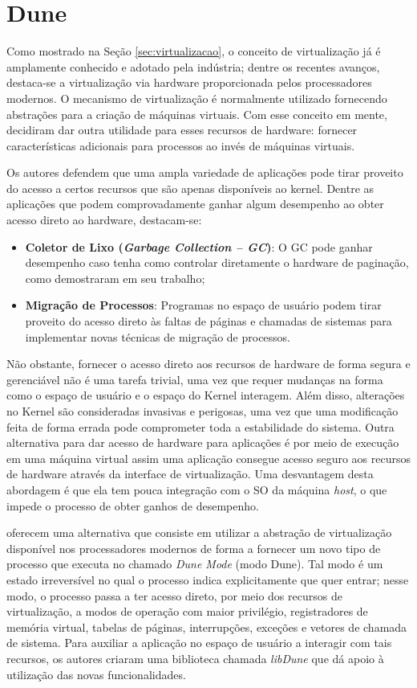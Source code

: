 \section{Dune}
\label{sec:dune}

Como mostrado na Seção \ref{sec:virtualizacao}, o conceito de virtualização já
é amplamente conhecido e adotado pela indústria; dentre os recentes avanços,
destaca-se a virtualização via hardware proporcionada pelos processadores
modernos. O mecanismo de virtualização é normalmente utilizado fornecendo
abstrações para a criação de máquinas virtuais. Com esse conceito em mente,
\citet{belay} decidiram dar outra utilidade para esses recursos de hardware:
fornecer características adicionais para processos ao invés de máquinas
virtuais.

Os autores defendem que uma ampla variedade de aplicações pode tirar proveito
do acesso a certos recursos que são apenas disponíveis ao kernel. Dentre as
aplicações que podem comprovadamente ganhar algum desempenho ao obter acesso
direto ao hardware, destacam-se:

\begin{itemize}
  \item \textbf{Coletor de Lixo (\emph{Garbage Collection -- GC})}: O GC pode ganhar desempenho caso
        tenha como controlar diretamente o hardware de paginação, como
        \citet{pauseless} demostraram em seu trabalho;
  \item \textbf{Migração de Processos}: Programas no espaço de usuário podem tirar
        proveito do acesso direto às faltas de páginas e chamadas de sistemas para
        implementar novas técnicas de migração de processos.
\end{itemize}

Não obstante, fornecer o acesso direto aos recursos de hardware de forma segura
e gerenciável não é uma tarefa trivial, uma vez que requer mudanças na forma
como o espaço de usuário e o espaço do Kernel interagem. Além disso, alterações
no Kernel são consideradas invasivas e perigosas, uma vez que uma modificação
feita de forma errada pode comprometer toda a estabilidade do sistema. Outra
alternativa para dar acesso de hardware para aplicações é por meio de execução
em uma máquina virtual assim uma aplicação consegue acesso seguro aos recursos
de hardware através da interface de virtualização. Uma desvantagem desta
abordagem é que ela tem pouca integração com o SO da máquina \emph{host}, o que
impede o processo de obter ganhos de desempenho.

\citet{belay} oferecem uma alternativa que consiste em utilizar a abstração de
virtualização disponível nos processadores modernos de forma a fornecer um novo
tipo de processo que executa no chamado \emph{Dune Mode} (modo Dune). Tal modo
é um estado irreversível no qual o processo indica explicitamente que quer
entrar; nesse modo, o processo passa a ter acesso direto, por meio dos recursos
de virtualização, a modos de operação com maior privilégio, registradores de
memória virtual, tabelas de páginas, interrupções, exceções e vetores de
chamada de sistema. Para auxiliar a aplicação no espaço de usuário a interagir
com tais recursos, os autores criaram uma biblioteca chamada \emph{libDune} que
dá apoio à utilização das novas funcionalidades.


